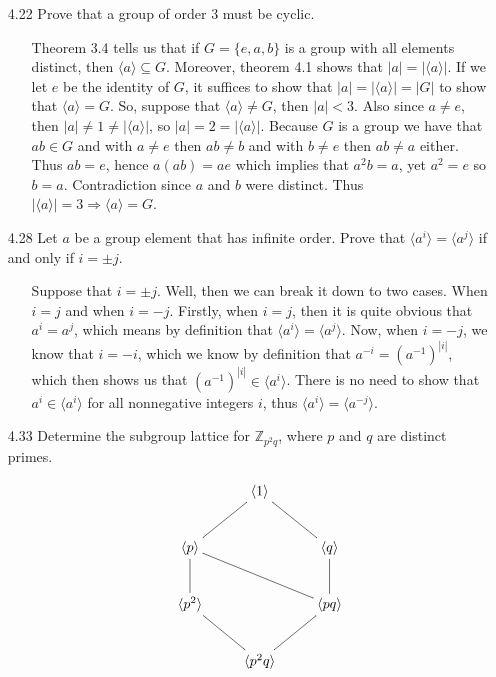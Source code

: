 \documentclass[12pt]{article}
\begin{document}
\begin{enumerate}
\item[4.22] Prove that a group of order 3 must be cyclic.
\begin{enumerate}
\item[] Theorem 3.4 tells us that if $G = \{e, a, b \}$ is a group with all elements distinct,
then $\langle a\rangle \subseteq G$. Moreover, theorem 4.1 shows that $|a| = |\langle a\rangle |$.
If we let $e$ be the identity of $G$, it suffices to show that $|a| = |\langle a\rangle | = |G|$
to show that $\langle a\rangle = G$. So, suppose that $\langle a\rangle \neq G$, then $|a| < 3$.
Also since $a \neq e$, then $|a| \neq 1 \neq |\langle a\rangle|$, so $|a| = 2 = |\langle a\rangle|$. Because $G$ is a group we have that $ab \in G$ and with $a \neq e$ then $ab \neq b$ and 
with $b \neq e$ then $ab \neq a$ either. Thus $ab = e$, hence $a(ab) = ae$ which implies that
$a^2b = a$, yet $a^2 = e$ so $b = a$. Contradiction since $a$ and $b$ were distinct. Thus
$|\langle a\rangle| = 3 \Rightarrow \langle a\rangle = G$.
\end{enumerate}

\item[4.28] Let $a$ be a group element that has infinite order. Prove that $\langle a^i\rangle
= \langle a^j\rangle$ if and only if $i = \pm j$.
\begin{enumerate}
\item[] Suppose that $i = \pm j$. Well, then we can break it down to two cases. When 
$i = j$ and when $i = -j$. Firstly, when $i = j$, then it is quite obvious that
$a^i = a^j$, which means by definition that $\langle a^i\rangle = \langle a^j\rangle$.
Now, when $i = -j$, we know that $i = -i$, which we know by definition that
$a^{-i} = (a^{-1})^{|i|}$, which then shows us that $(a^{-1})^{|i|} \in \langle a^i\rangle$.
There is no need to show that $a^i \in \langle a^i\rangle$ for all nonnegative integers $i$, thus
$\langle a^i\rangle = \langle a^{-j}\rangle$. 
\end{enumerate}

\item[4.33] Determine the subgroup lattice for $\mathbb{Z}_{p^2q}$, where $p$ and $q$ are
distinct primes.
\begin{enumerate}
\item[]
\begin{displaymath}
\xymatrix{
& \langle 1 \rangle \ar@{-}[dl] \ar@{-}[dr] &    \\
\langle p\rangle \ar@{-}[d] \ar@{-}[drr] &  & \langle q\rangle \ar@{-}[d] \\
\langle p^2 \rangle \ar@{-}[dr] &  & \langle pq \rangle \ar@{-}[dl] \\
& \langle p^2q\rangle &  \\
}
\end{displaymath}
\end{enumerate}


\end{enumerate}
\end{document}
